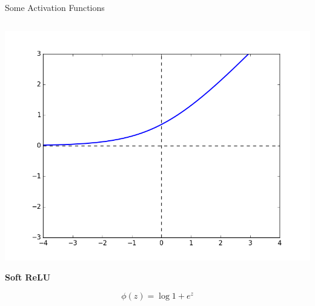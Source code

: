 \documentclass[11pt,handout,aspectratio=169]{beamer}
\begin{document}
\begin{frame}{Some Activation Functions}
\begin{columns}
    \begin{column}{0.25 \linewidth}
      \includegraphics[width=\linewidth]{pics/act_soft_relu.png}
      \begin{center}
        {\bf Soft ReLU}
      \end{center}
      \[ \phi(z) = \log 1 + e^z \]
    \end{column}
  \end{columns}
\end{frame}
\end{document}
